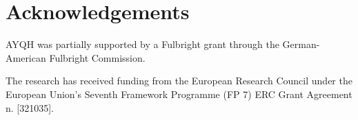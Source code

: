 \documentclass[12pt, preprint]{aastex}
\begin{document}
\section{Acknowledgements}

AYQH was partially supported by a Fulbright grant through the German-American
Fulbright Commission.

The research has received funding from the European Research Council under the
European Union's Seventh Framework Programme (FP 7) ERC Grant Agreement n.
[321035].


\end{document}
